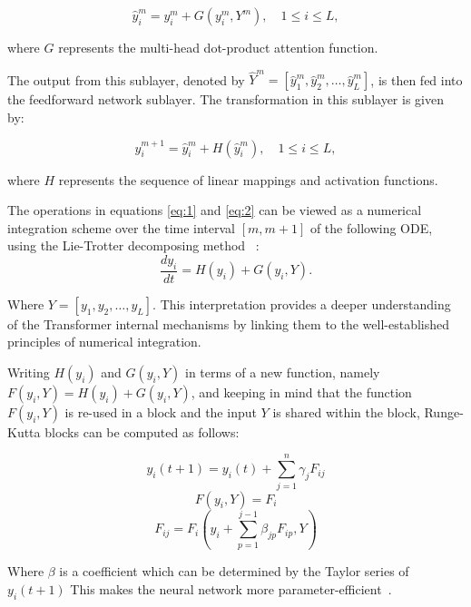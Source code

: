 \documentclass[12pt,a4paper]{report}
\begin{document}
\begin{equation}\label{eq:1}
  \hat{y}_i^m = y_i^m + G(y_i^m, Y^m), \quad 1 \leq i \leq L,
\end{equation}

where \( G \) represents the multi-head dot-product attention function.

The output from this sublayer, denoted by \( \hat{Y}^m = [\hat{y}_1^m, \hat{y}_2^m, \ldots, \hat{y}_L^m] \), is then fed into the feedforward network sublayer. The transformation in this sublayer is given by:

\begin{equation}\label{eq:2}
  y_i^{m+1} = \hat{y}_i^m + H(\hat{y}_i^m), \quad 1 \leq i \leq L,
\end{equation}

where \( H \) represents the sequence of linear mappings and activation functions.

The operations in equations \ref{eq:1} and \ref{eq:2} can be viewed as a numerical integration scheme over the time interval \([m, m+1]\) of the following ODE, using the Lie-Trotter decomposing method ~\cite{lu2019understanding, dutta2021redesigning}:
\begin{equation}
  \frac{dy_i}{dt} = H(y_i) + G(y_i, Y).
\end{equation}

Where \( Y = [{y}_1, {y}_2, \ldots, {y}_L] \). This interpretation provides a deeper understanding of the Transformer internal mechanisms by linking them to the well-established principles of numerical integration.

Writing $H(y_i)$ and $G(y_i, Y)$ in terms of a new function, namely $F(y_i, Y) = H(y_i) + G(y_i, Y)$, and keeping in mind that the function $F(y_i, Y)$ is re-used in a block and the input $Y$ is shared within the block, Runge-Kutta blocks can be computed as follows:

\begin{equation}
  y_i(t + 1) = y_i(t) + \sum_{j=1}^{n}\gamma_{j}F_{ij}
\end{equation}
\begin{equation}
  F(y_i, Y) = F_i
\end{equation}
\begin{equation}
  F_{ij} = F_i(y_i + \sum_{p=1}^{j-1}\beta_{jp}F_{ip}, Y)
\end{equation}

Where $\beta$ is a coefficient which can be determined by the Taylor series of $y_i(t+1)$ This makes the neural network more parameter-efficient~\cite{li2022ode}.
\end{document}
